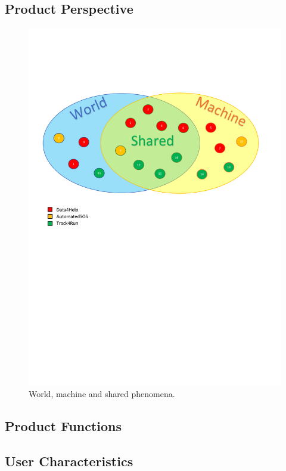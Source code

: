 \documentclass[a4paper]{article}
\begin{document}
\subsection{Product Perspective}

\begin{figure}[h!]
    \centering
    \includegraphics[width=\linewidth]{worldMachineShared-small}
    \caption{World, machine and shared phenomena.}
    \label{fig:my_label}
\end{figure}


\subsection{Product Functions}

\subsection{User Characteristics}
\end{document}
